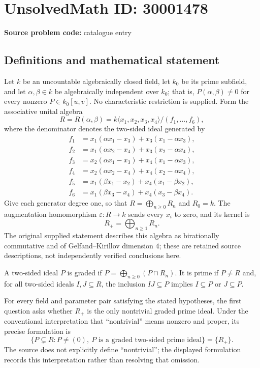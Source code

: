 \documentclass[11pt]{article}
\begin{document}
\section*{UnsolvedMath ID: 30001478}
\textbf{Source problem code:} catalogue entry
\subsection{Definitions and mathematical statement}
Let \(k\) be an uncountable algebraically closed field, let \(k_0\) be its prime subfield, and let \(\alpha,\beta\in k\) be algebraically independent over \(k_0\); that is, \(P(\alpha,\beta)\ne0\) for every nonzero \(P\in k_0[u,v]\). No characteristic restriction is supplied. Form the associative unital algebra
\[
R=R(\alpha,\beta)=k\langle x_1,x_2,x_3,x_4\rangle/(f_1,\ldots,f_6),
\]
where the denominator denotes the two-sided ideal generated by
\[
\begin{aligned}
f_1&=x_1(\alpha x_1-x_3)+x_3(x_1-\alpha x_3),\\
f_2&=x_1(\alpha x_2-x_4)+x_3(x_2-\alpha x_4),\\
f_3&=x_2(\alpha x_1-x_3)+x_4(x_1-\alpha x_3),\\
f_4&=x_2(\alpha x_2-x_4)+x_4(x_2-\alpha x_4),\\
f_5&=x_1(\beta x_1-x_2)+x_4(x_1-\beta x_2),\\
f_6&=x_1(\beta x_3-x_4)+x_4(x_3-\beta x_4).
\end{aligned}
\]
Give each generator degree one, so that \(R=\bigoplus_{n\ge0}R_n\) and \(R_0=k\). The augmentation homomorphism \(\varepsilon:R\to k\) sends every \(x_i\) to zero, and its kernel is
\[
R_+=\bigoplus_{n\ge1}R_n.
\]
The original supplied statement describes this algebra as birationally commutative and of Gelfand--Kirillov dimension \(4\); these are retained source descriptions, not independently verified conclusions here.

A two-sided ideal \(P\) is graded if \(P=\bigoplus_{n\ge0}(P\cap R_n)\). It is prime if \(P\ne R\) and, for all two-sided ideals \(I,J\subseteq R\), the inclusion \(IJ\subseteq P\) implies \(I\subseteq P\) or \(J\subseteq P\).

For every field and parameter pair satisfying the stated hypotheses, the first question asks whether \(R_+\) is the only nontrivial graded prime ideal. Under the conventional interpretation that ``nontrivial'' means nonzero and proper, its precise formulation is
\[
\{P\subsetneq R: P\ne(0),\ P\text{ is a graded two-sided prime ideal}\}=\{R_+\}.
\]
The source does not explicitly define ``nontrivial''; the displayed formulation records this interpretation rather than resolving that omission.
\end{document}
